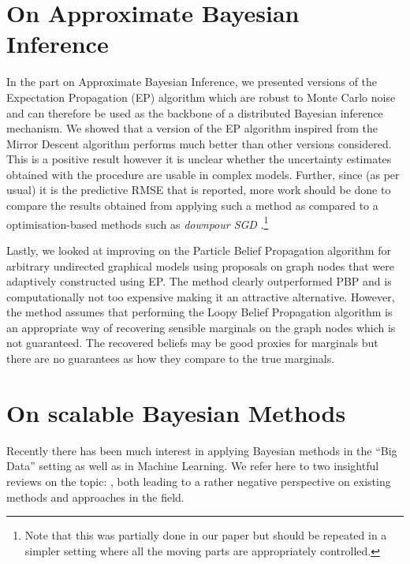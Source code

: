 \section{On Approximate Bayesian Inference}

In the part on Approximate Bayesian Inference, we presented versions of the Expectation Propagation (EP) algorithm which are robust to Monte Carlo noise and can therefore be used as the backbone of a distributed Bayesian inference mechanism. We showed that a version of the EP algorithm inspired from the Mirror Descent algorithm performs much better than other versions considered. This is a positive result however it is unclear whether the uncertainty estimates obtained with the procedure are usable in complex models. Further, since (as per usual) it is the predictive RMSE that is reported, more work should be done to compare the results obtained from applying such a method as compared to a optimisation-based methods such as \emph{downpour SGD} \citep{dean12}.\footnote{Note that this was partially done in our paper \citep{hasenclever16} but should be repeated in a simpler setting where all the moving parts are appropriately controlled.} 

Lastly, we looked at improving on the Particle Belief Propagation algorithm for arbitrary undirected graphical models using proposals on graph nodes that were adaptively constructed using EP. The method clearly outperformed PBP and is computationally not too expensive making it an attractive alternative. However, the method assumes that performing the Loopy Belief Propagation algorithm is an appropriate way of recovering sensible marginals on the graph nodes which is not guaranteed. The recovered beliefs may be good proxies for marginals but there are no guarantees as how they compare to the true marginals.

\section{On scalable Bayesian Methods}

Recently there has been much interest in applying Bayesian methods in the ``Big Data'' setting as well as in Machine Learning. We refer here to two insightful reviews on the topic: \citet{green15, bardenet17}, both leading to a rather negative perspective on existing methods and approaches in the field. 

